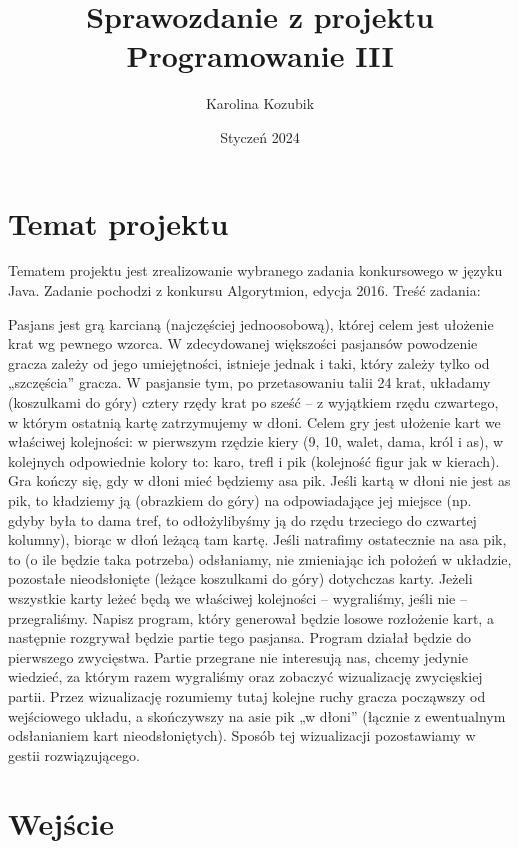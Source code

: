 \documentclass{article}
\title{Sprawozdanie z projektu Programowanie III}
\author{Karolina Kozubik}
\date{Styczeń 2024}
\begin{document}
\maketitle
\section{Temat projektu}

Tematem projektu jest zrealizowanie wybranego zadania konkursowego w języku Java. Zadanie pochodzi z konkursu Algorytmion, edycja 2016.
Treść zadania:


Pasjans jest grą karcianą (najczęściej jednoosobową), której celem jest ułożenie krat wg
pewnego wzorca. W zdecydowanej większości pasjansów powodzenie gracza zależy od jego
umiejętności, istnieje jednak i taki, który zależy tylko od „szczęścia” gracza.
W pasjansie tym, po przetasowaniu talii 24 krat, układamy (koszulkami do góry) cztery
rzędy krat po sześć – z wyjątkiem rzędu czwartego, w którym ostatnią kartę zatrzymujemy w
dłoni. Celem gry jest ułożenie kart we właściwej kolejności: w pierwszym rzędzie kiery (9,
10, walet, dama, król i as), w kolejnych odpowiednie kolory to: karo, trefl i pik (kolejność
figur jak w kierach).
Gra kończy się, gdy w dłoni mieć będziemy asa pik. Jeśli kartą w dłoni nie jest as pik, to
kładziemy ją (obrazkiem do góry) na odpowiadające jej miejsce (np. gdyby była to dama tref,
to odłożylibyśmy ją do rzędu trzeciego do czwartej kolumny), biorąc w dłoń leżącą tam kartę.
Jeśli natrafimy ostatecznie na asa pik, to (o ile będzie taka potrzeba) odsłaniamy, nie
zmieniając ich położeń w układzie, pozostałe nieodsłonięte (leżące koszulkami do góry)
dotychczas karty. Jeżeli wszystkie karty leżeć będą we właściwej kolejności – wygraliśmy,
jeśli nie – przegraliśmy.
Napisz program, który generował będzie losowe rozłożenie kart, a następnie rozgrywał
będzie partie tego pasjansa. Program działał będzie do pierwszego zwycięstwa. Partie
przegrane nie interesują nas, chcemy jedynie wiedzieć, za którym razem wygraliśmy oraz
zobaczyć wizualizację zwycięskiej partii. Przez wizualizację rozumiemy tutaj kolejne ruchy
gracza począwszy od wejściowego układu, a skończywszy na asie pik „w dłoni” (łącznie z
ewentualnym odsłanianiem kart nieodsłoniętych). Sposób tej wizualizacji pozostawiamy w
gestii rozwiązującego. 
\cite{algorytmion}

\section{Wejście}
\end{document}
